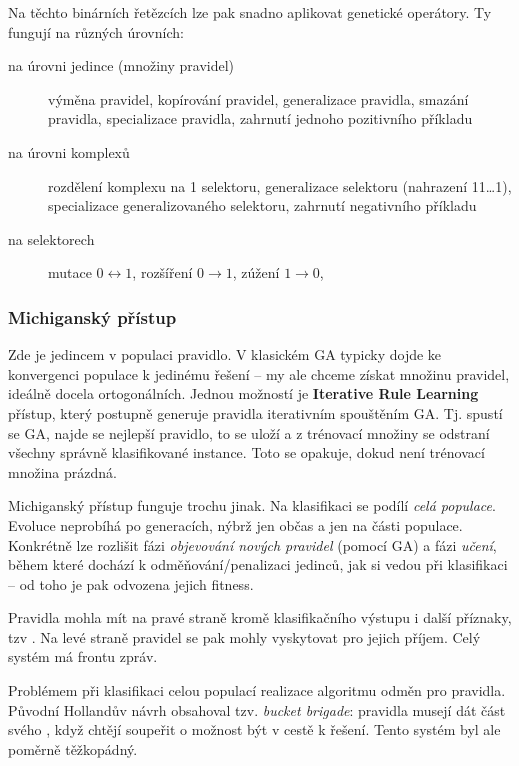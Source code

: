 Na těchto binárních řetězcích lze pak snadno aplikovat genetické operátory. Ty fungují na různých úrovních:
\begin{description}
	
	
	\item[na úrovni jedince (množiny pravidel)] výměna pravidel, kopírování pravidel, generalizace pravidla, smazání pravidla, specializace pravidla, zahrnutí jednoho pozitivního příkladu
	\item[na úrovni komplexů] rozdělení komplexu na 1 selektoru, generalizace selektoru (nahrazení 11\dots1), specializace
	generalizovaného selektoru, zahrnutí negativního příkladu
	\item[na selektorech] mutace $0 \leftrightarrow 1$, rozšíření $0 \rightarrow 1$, zúžení $1 \rightarrow 0$,
\end{description}

\subsubsection{Michiganský přístup}
Zde je jedincem v populaci pravidlo. V klasickém GA typicky dojde ke konvergenci populace k jedinému řešení -- my ale chceme získat množinu pravidel, ideálně docela ortogonálních. Jednou možností je \textbf{Iterative Rule Learning} přístup, který postupně generuje pravidla iterativním spouštěním GA. Tj. spustí se GA, najde se nejlepší pravidlo, to se uloží a z trénovací množiny se odstraní všechny správně klasifikované instance. Toto se opakuje, dokud není trénovací množina prázdná.

Michiganský přístup funguje trochu jinak. Na klasifikaci se podílí \textit{celá populace}. Evoluce neprobíhá po generacích, nýbrž jen občas a jen na části populace. Konkrétně lze rozlišit fázi \textit{objevování nových pravidel} (pomocí GA) a fázi \textit{učení}, během které dochází k odměňování/penalizaci jedinců, jak si vedou při klasifikaci -- od toho je pak odvozena jejich fitness.

Pravidla mohla mít na pravé straně kromě klasifikačního výstupu i další příznaky, tzv . Na levé straně pravidel se pak mohly vyskytovat  pro jejich příjem. Celý systém má frontu zpráv.

Problémem při klasifikaci celou populací realizace algoritmu odměn pro pravidla. Původní Hollandův návrh obsahoval tzv. \textit{bucket brigade}: pravidla musejí dát část svého , když chtějí soupeřit o možnost být v cestě k řešení. Tento systém byl ale poměrně těžkopádný. 


